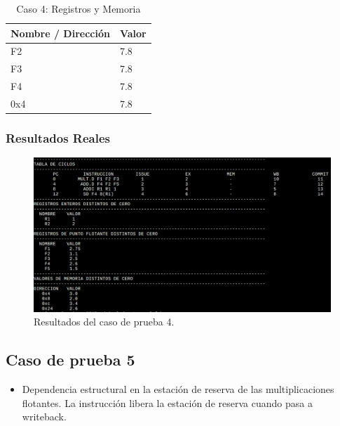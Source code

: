 \documentclass[a4paper]{article}
\begin{document}
	\begin{table}[H]
		\centering
		\caption*{Caso 4: Registros y Memoria}
		\begin{tabular}{|l|l|}
			\hline
			\textbf{Nombre / Dirección} & \textbf{Valor} \\ \hline
			F2                          & 7.8            \\ \hline
			F3                          & 7.8            \\ \hline
			F4                          & 7.8            \\ \hline
			0x4                         & 7.8            \\ \hline
		\end{tabular}
	\end{table}

	\subsubsection*{Resultados Reales}

	\begin{figure}[H]
	\centering
	\includegraphics[width=1\textwidth]{figures/test4.png}
	\caption{\label{fig:bloques}Resultados del caso de prueba 4.}
	\end{figure}


	\subsection*{Caso de prueba 5}

	\begin{itemize}
		\item Dependencia estructural en la estación de reserva de las multiplicaciones flotantes. La instrucción libera la estación de reserva cuando pasa a writeback.  
	\end{itemize}
\end{document}
